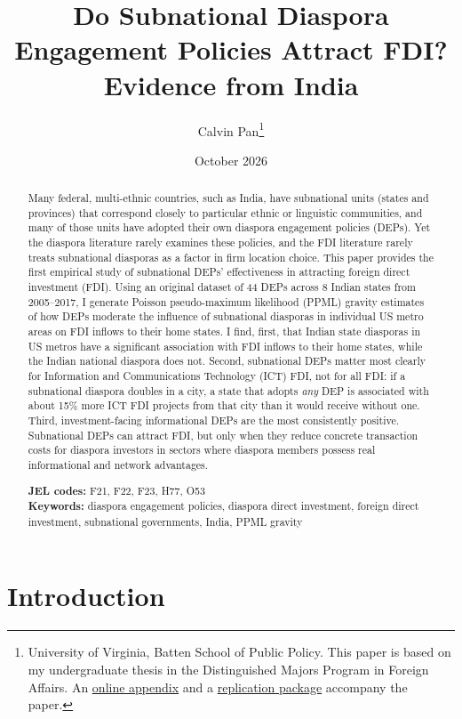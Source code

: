 \documentclass[12pt]{article}
\title{Do Subnational Diaspora Engagement Policies Attract FDI?\\ Evidence from India}
\author{Calvin Pan\thanks{University of Virginia, Batten School of Public Policy. This paper is based on my undergraduate thesis in the Distinguished Majors Program in Foreign Affairs. An \href{\appendixurl}{online appendix} and a \href{\repourl}{replication package} accompany the paper.}}
\date{October 2026}
\begin{document}
\maketitle
\thispagestyle{empty}

\begin{abstract}
\noindent Many federal, multi-ethnic countries, such as India, have subnational units (states and provinces) that correspond closely to particular ethnic or linguistic communities, and many of those units have adopted their own diaspora engagement policies (DEPs). Yet the diaspora literature rarely examines these policies, and the FDI literature rarely treats subnational diasporas as a factor in firm location choice. This paper provides the first empirical study of subnational DEPs' effectiveness in attracting foreign direct investment (FDI). Using an original dataset of 44 DEPs across 8 Indian states from 2005--2017, I generate Poisson pseudo-maximum likelihood (PPML) gravity estimates of how DEPs moderate the influence of subnational diasporas in individual US metro areas on FDI inflows to their home states. I find, first, that Indian state diasporas in US metros have a significant association with FDI inflows to their home states, while the Indian national diaspora does not. Second, subnational DEPs matter most clearly for Information and Communications Technology (ICT) FDI, not for all FDI: if a subnational diaspora doubles in a city, a state that adopts \textit{any} DEP is associated with about 15\% more ICT FDI projects from that city than it would receive without one. Third, investment-facing informational DEPs are the most consistently positive. Subnational DEPs can attract FDI, but only when they reduce concrete transaction costs for diaspora investors in sectors where diaspora members possess real informational and network advantages.

\vspace{1em}
\noindent \textbf{JEL codes:} F21, F22, F23, H77, O53\\
\noindent \textbf{Keywords:} diaspora engagement policies, diaspora direct investment, foreign direct investment, subnational governments, India, PPML gravity
\end{abstract}

\newpage
\setcounter{page}{1}

\section{Introduction} \label{sec:intro}
\end{document}
